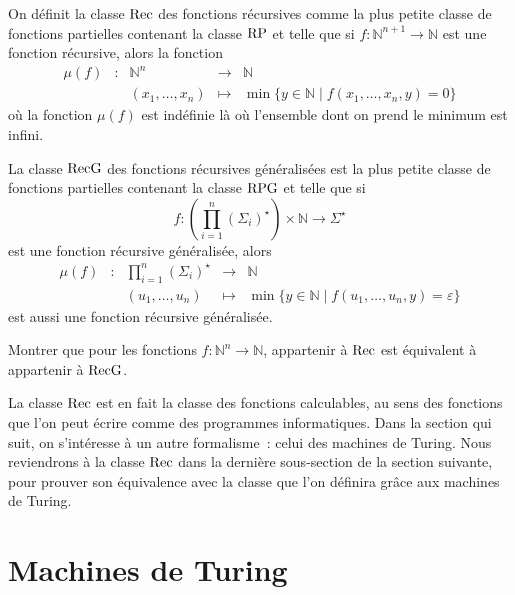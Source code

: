 \begin{definition}
  On définit la classe $\operatorname{Rec}$ des fonctions récursives comme la plus petite
  classe de fonctions partielles contenant la classe $\operatorname{RP}$ et telle que si
  $f : \mathbb N^{n+1} \to \mathbb N$ est une fonction récursive, alors
  la fonction
  \[\begin{array}{ccccc}
  \mu(f) & : & \mathbb N^n & \longrightarrow & \mathbb N\\
  & & (x_1,\ldots,x_n) &\longmapsto & \min \{y \in \mathbb N \mid
  f(x_1,\ldots,x_n,y) = 0\}
  \end{array}\]
  où la fonction $\mu(f)$ est indéfinie là où l'ensemble dont on prend le
  minimum est infini.

  La classe $\operatorname{RecG}$ des fonctions récursives généralisées est la plus petite
  classe de fonctions partielles contenant la classe $\operatorname{RPG}$ et telle que si
  \[f : \left(\prod_{i = 1}^n (\Sigma_i)^\star\right)
  \times \mathbb N \to \Sigma^\star\]
  est une fonction récursive généralisée, alors
  \[\begin{array}{ccccc}
  \mu(f) & : & \displaystyle\prod_{i = 1}^n (\Sigma_i)^\star &\longrightarrow &
  \mathbb N\\
  & & (u_1,\ldots,u_n) &\longmapsto &\min\{y \in \mathbb N \mid
  f(u_1,\ldots,u_n,y) = \varepsilon\}
  \end{array}\]
  est aussi une fonction récursive généralisée.
\end{definition}

\begin{exercise}
  Montrer que pour les fonctions $f : \mathbb N^n \to \mathbb N$, appartenir à
  $\operatorname{Rec}$ est équivalent à appartenir à $\operatorname{RecG}$.
\end{exercise}

La classe $\operatorname{Rec}$ est en fait la classe des fonctions calculables, au sens des
fonctions que l'on peut écrire comme des programmes informatiques. Dans la
section qui suit, on s'intéresse à un autre formalisme~: celui des machines de
Turing. Nous reviendrons à la classe $\operatorname{Rec}$ dans la dernière sous-section de la
section suivante, pour prouver son équivalence avec la classe que l'on définira
grâce aux machines de Turing.

\section{Machines de Turing}

